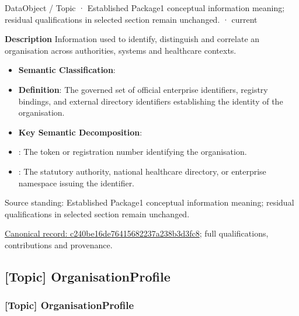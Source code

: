 \label{element:c240be16de76415682237a238b3d3fc8}
{\small DataObject / Topic · Established Package1 conceptual information meaning; residual qualifications in selected section remain unchanged. · current}\par

\textbf{Description}
Information used to identify, distinguish and correlate an organisation across authorities, systems and healthcare contexts.



\begin{itemize}


\item \textbf{Semantic Classification}: \texttt{}

\item \textbf{Definition}: The governed set of official enterprise identifiers, registry bindings, and external directory identifiers establishing the identity of the organisation.

\item \textbf{Key Semantic Decomposition}:

\item \texttt{}: The token or registration number identifying the organisation.

\item \texttt{}: The statutory authority, national healthcare directory, or enterprise namespace issuing the identifier.

\end{itemize}


Source standing: Established Package1 conceptual information meaning; residual qualifications in selected section remain unchanged.


{\footnotesize \href{../../../../continuum/application/data-object/topic/c240be16de76415682237a238b3d3fc8.md}{Canonical record: c240be16de76415682237a238b3d3fc8}; full qualifications, contributions and provenance.}\par
\subsection{[Topic] OrganisationProfile}

\subsubsection{[Topic] OrganisationProfile}

